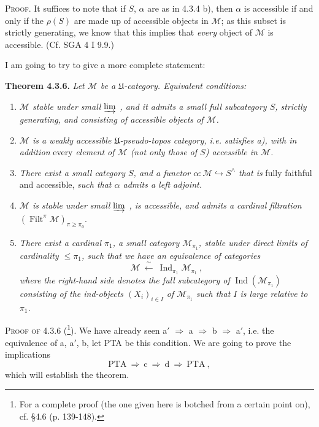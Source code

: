 \documentclass[11pt]{article}
\newcommand{\printedpage}[1]{\marginpar{\footnotesize p.~#1}}
\newcommand{\msp}[1]{\marginpar{\footnotesize [#1]}}
\newcommand{\Filt}{\operatorname{Filt}}
\newcommand{\Ind}{\operatorname{Ind}}
\begin{document}
\noindent\msp{page 70}\textsc{Proof}. It suffices to note that if $S$, $\alpha$ are as in 4.3.4 b), then $\alpha$ is accessible if and only if the $\rho(S)$ are made up of accessible objects in $\mathcal M$; as this subset is strictly generating, we know that this implies that \textit{every} object of $\mathcal M$ is accessible. (Cf. SGA 4 I 9.9.)

\noindent I am going to try to give a more complete statement:

\noindent\textbf{Theorem 4.3.6.} \textit{Let $\mathcal M$ be a $\mathfrak U$-category. Equivalent conditions:}
\begin{enumerate}[label={}]
\item[\textit{a)}] \textit{$\mathcal M$ stable under small $\varinjlim$ , and it admits a small full subcategory $S$, strictly generating, and consisting of accessible objects of $\mathcal M$.}
\item[\textit{a$'$)}] \textit{$\mathcal M$ is a weakly accessible $\mathfrak U$-pseudo-topos category, i.e. satisfies a), with in addition} every \textit{element of $\mathcal M$ (not only those of $S$) accessible in $\mathcal M$.}
\item[\textit{b)}] \textit{There exist a small category $S$, and a functor $\alpha:\mathcal M\hookrightarrow S^\wedge$ that is} fully faithful and accessible, \textit{such that $\alpha$ admits a left adjoint.}
\item[\textit{c)}] \msp{page 71}\textit{$\mathcal M$ is stable under small $\varinjlim$ , is accessible, and admits a cardinal filtration} $(\Filt^\pi\mathcal M)_{\pi\geqslant\pi_0}$.
\item[\textit{d)}] \textit{There exist a cardinal $\pi_1$, a small category $\mathcal M_{\pi_1}$, stable under direct limits of cardinality $\leqslant\pi_1$, such that we have an equivalence of categories}
\[
\mathcal M\ \xleftarrow{\ \sim\ }\ \Ind_{\pi_1}\mathcal M_{\pi_1}\ ,
\tag*{(4.3.6.1)}
\]
\textit{where the right-hand side denotes the full subcategory of} $\Ind(\mathcal M_{\pi_1})$ \textit{consisting of the ind-objects $(X_i)_{i\in I}$ of $\mathcal M_{\pi_1}$ such that $I$ is large relative to $\pi_1$.}
\end{enumerate}

\noindent\textsc{Proof of} 4.3.6 (\footnote{For a complete proof (the one given here is botched from a certain point on), cf. §4.6 (p. 139-148).}). We have already seen a$'$ $\Longrightarrow$ a $\Longrightarrow$ b $\Longrightarrow$ a$'$, i.e. the equivalence of a, a$'$, b, let PTA be this condition. We are going to prove the implications
\[
\mathrm{PTA}\ \Longrightarrow\ \mathrm{c}\ \Longrightarrow\ \mathrm{d}\ \Longrightarrow\ \mathrm{PTA}\ ,
\]
\printedpage{12}%
which will establish the theorem.
\end{document}
